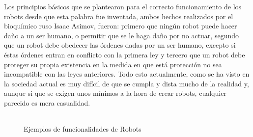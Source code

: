 \hspace{1cm} Los principios básicos que se plantearon para el correcto funcionamiento de los robots desde que esta palabra fue inventada, ambos hechos realizados por el bioquímico ruso Isaac Asimov, fueron: primero que ningún robot puede hacer daño a un ser humano, o permitir que se le haga daño por no actuar, segundo que un robot debe obedecer las órdenes dadas por un ser humano, excepto si éstas órdenes entran en conflicto con la primera ley y tercero que un robot debe proteger su propia existencia en la medida en que está protección no sea incompatible con las leyes anteriores. Todo esto actualmente, como se ha visto en la sociedad actual es muy difícil de que se cumpla y dista mucho de la realidad y, aunque si que se exigen unos mínimos a la hora de crear robots, cualquier parecido es mera casualidad.
\\
\\
\begin{figure}[H]
 \centering
 \caption{Ejemplos de funcionalidades de Robots}
 \label{f:Ejemplos de funcionalidades de Robots}
\end{figure}  

